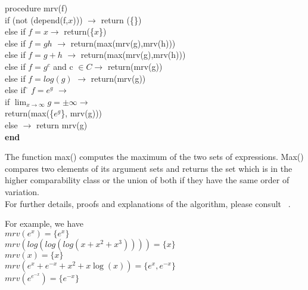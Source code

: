 \begin{tabbing}      
procedure mrv(f) \= \\ %
  if (not (depend(f,$x$)))  $\rightarrow$ return (\{\}) \\
  \> else if $f=x \rightarrow$   return(\{$x$\}) \\
 \> else if $f=gh$  $\rightarrow$   return(max(mrv(g),mrv(h))) \\
  else if $f=g+h$ $\rightarrow$   return(max(mrv(g),mrv(h))) \\
  else if $f=g^{c}$ and c $\in C \rightarrow$   return(mrv(g)) \\
  else if $f=log(g)$ $\rightarrow$   return(mrv(g)) \\
  else if \= $f=e^{g}$ $\rightarrow$  \\
   \>   if $\lim_{x \rightarrow \infty} g=\pm\infty \rightarrow$ \\
   \>        return(max(\{$e^{g}$\}, mrv(g))) \\
    \>  else $\rightarrow $ return mrv(g) \\
\bf{end}
\end{tabbing}

\vspace{5 mm}
The function max() computes the maximum of the two sets of expressions. Max() compares two elements of its argument sets and returns the set which is in the higher comparability class or the union of both if they have the same order of variation. \\

For further details, proofs and explanations of the algorithm, please consult ~\cite{Grn96}.
\pagebreak

For example, we have \\

$mrv(e^{x})=\{e^x\}$ \\
$mrv(log(log(log(x+x^2+x^3))))=\{x\} $ \\
$mrv(x)=\{x\} $\\
$mrv(e^x+e^{-x}+x^2+x \log(x))= \{e^x,e^{-x} \}$ \\
$mrv(e^{e^{-x}})=\{e^{-x} \} $ \\

